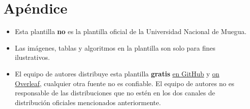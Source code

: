 \section{Apéndice}
\begin{itemize}
\item Esta plantilla \textbf{no} es la plantilla oficial de la Universidad Nacional de Muegua.
\item Las imágenes, tablas y algoritmos en la plantilla son solo para fines ilustrativos.
\item El equipo de autores distribuye esta plantilla \textbf{gratis} \href{https://github.com/khongsomeo/latex-products}{en GitHub} y \href{https://www.overleaf.com/latex/ templates/hcmus-report-template/zyrhmsxynwqs}{on Overleaf}, cualquier otra fuente no es confiable. El equipo de autores no es responsable de las distribuciones que no estén en los dos canales de distribución oficiales mencionados anteriormente.
\end{itemize}
